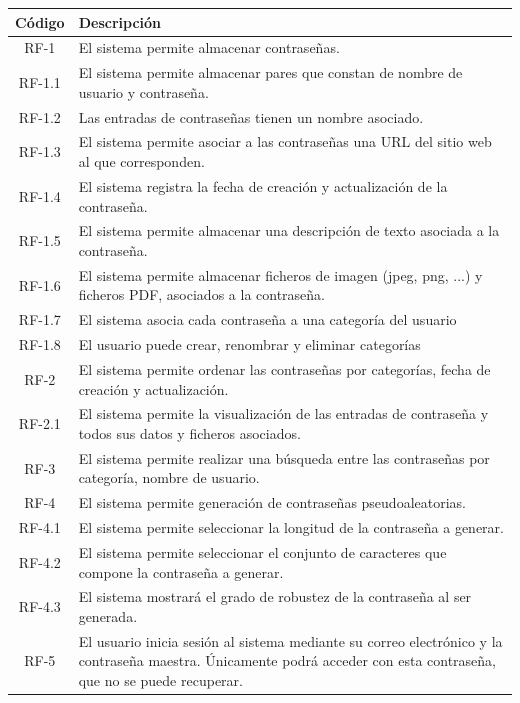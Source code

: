 \documentclass{article}
\begin{document}
\begin{table}[H]
    \centering
    \begin{tabular}{| c | p{30em} |}
    \hline
        Código &  Descripción  \\ \hline
        RF-1 & El sistema permite almacenar contraseñas. \\ \hline
        RF-1.1 & El sistema permite almacenar pares que constan de nombre de usuario y contraseña.  \\ \hline
        RF-1.2 & Las entradas de contraseñas tienen un nombre asociado. \\ \hline
        RF-1.3 & El sistema permite asociar a las contraseñas una URL del sitio web al que corresponden. \\ \hline
        RF-1.4 & El sistema registra la fecha de creación y actualización de la contraseña. \\ \hline
        RF-1.5 & El sistema permite almacenar una descripción de texto asociada a la contraseña. \\ \hline
        RF-1.6 & El sistema permite almacenar ficheros de imagen (jpeg, png, ...) y ficheros PDF, asociados a la contraseña. \\ \hline
        RF-1.7 & El sistema asocia cada contraseña a una categoría del usuario\\ \hline
        RF-1.8 & El usuario puede crear, renombrar y eliminar categorías \\ \hline
        RF-2 & El sistema permite ordenar las contraseñas por categorías, fecha de creación y actualización. \\ \hline
        RF-2.1 & El sistema permite la visualización de las entradas de contraseña y todos sus datos y ficheros asociados.\\ \hline
        RF-3 & El sistema permite realizar una búsqueda entre las contraseñas por categoría, nombre de usuario.  \\ \hline
        RF-4 & El sistema permite generación de contraseñas pseudoaleatorias. \\ \hline
        RF-4.1 & El sistema permite seleccionar la longitud de la contraseña a generar.\\ \hline
        RF-4.2 & El sistema permite seleccionar el conjunto de caracteres que compone la contraseña a generar.\\ \hline
        RF-4.3 & El sistema mostrará el grado de robustez de la contraseña al ser generada. \\ \hline
        RF-5 & El usuario inicia sesión al sistema mediante su correo electrónico y la contraseña maestra. Únicamente podrá acceder con esta contraseña, que no se puede recuperar.\\ \hline

\end{tabular}
\end{table}
\end{document}
